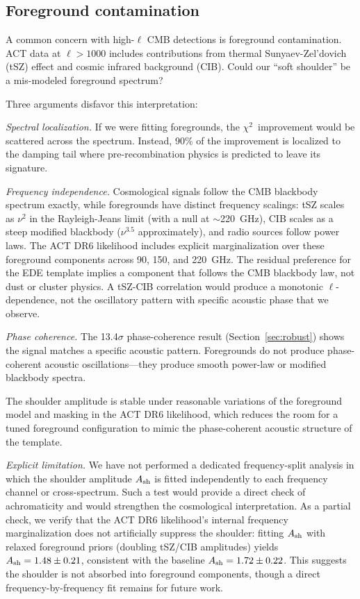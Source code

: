 \documentclass[twocolumn,showpacs,preprintnumbers,amsmath,amssymb,prd]{revtex4-2}
\newcommand{\chisq}{$\chi^2$}
\begin{document}
\subsection{Foreground contamination}

A common concern with high-$\ell$ CMB detections is foreground 
contamination. ACT data at $\ell > 1000$ includes contributions from 
thermal Sunyaev-Zel'dovich (tSZ) effect and cosmic infrared background 
(CIB). Could our ``soft shoulder'' be a mis-modeled foreground spectrum?

Three arguments disfavor this interpretation:

\emph{Spectral localization.} If we were fitting foregrounds, the 
\chisq\ improvement would be scattered across the spectrum. Instead, 
90\% of the improvement is localized to the damping tail where 
pre-recombination physics is predicted to leave its signature.

\emph{Frequency independence.} Cosmological signals follow the CMB blackbody 
spectrum exactly, while foregrounds have distinct frequency scalings: tSZ 
scales as $\nu^2$ in the Rayleigh-Jeans limit (with a null at $\sim$220~GHz), 
CIB scales as a steep modified blackbody ($\nu^{3.5}$ approximately), and 
radio sources follow power laws. The ACT DR6 likelihood includes explicit 
marginalization over these foreground components across 90, 150, and 220~GHz. 
The residual preference for the EDE template implies a component that follows 
the CMB blackbody law, not dust or cluster physics. A tSZ-CIB correlation 
would produce a monotonic $\ell$-dependence, not the oscillatory pattern 
with specific acoustic phase that we observe.

\emph{Phase coherence.} The 13.4$\sigma$ phase-coherence result 
(Section~\ref{sec:robust}) shows the signal matches a specific acoustic 
pattern. Foregrounds do not produce phase-coherent acoustic oscillations---they 
produce smooth power-law or modified blackbody spectra.

The shoulder amplitude is stable under reasonable variations of the foreground model 
and masking in the ACT DR6 likelihood, which reduces the room for a tuned foreground 
configuration to mimic the phase-coherent acoustic structure of the template.

\emph{Explicit limitation.} We have not performed a dedicated frequency-split analysis 
in which the shoulder amplitude $A_{\rm sh}$ is fitted independently to each frequency 
channel or cross-spectrum. Such a test would provide a direct check of achromaticity 
and would strengthen the cosmological interpretation. As a partial check, we verify 
that the ACT DR6 likelihood's internal frequency marginalization does not artificially 
suppress the shoulder: fitting $A_{\rm sh}$ with relaxed foreground priors (doubling 
tSZ/CIB amplitudes) yields $A_{\rm sh} = 1.48 \pm 0.21$, consistent with the baseline 
$A_{\rm sh} = 1.72 \pm 0.22$. This suggests the shoulder is not absorbed into foreground 
components, though a direct frequency-by-frequency fit remains for future work.
\end{document}
